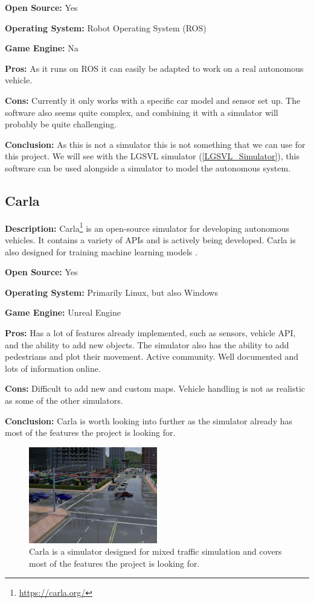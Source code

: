 \textbf{Open Source:} Yes

\textbf{Operating System:} Robot Operating System (ROS)

\textbf{Game Engine:} Na

\textbf{Pros:} As it runs on ROS it can easily be adapted to work on a real autonomous vehicle.

\textbf{Cons:} Currently it only works with a specific car model and sensor set up. The software also seems quite complex, and combining it with a simulator will probably be quite challenging.

\textbf{Conclusion:} As this is not a simulator this is not something that we can use for this project. We will see with the LGSVL simulator (\ref{LGSVL_Simulator}), this software can be used alongside a simulator to model the autonomous system. 


\subsection{Carla} \label{Carla}
\textbf{Description:} Carla\footnote{\url{https://carla.org/}} is an open-source simulator for developing autonomous vehicles. It contains a variety of APIs and is actively being developed. Carla is also designed for training machine learning models \cite{CarlaPaper}. 

\textbf{Open Source:} Yes

\textbf{Operating System:} Primarily Linux, but also Windows

\textbf{Game Engine:} Unreal Engine

\textbf{Pros:} Has a lot of features already implemented, such as sensors, vehicle API, and the ability to add new objects. The simulator also has the ability to add pedestrians and plot their movement. Active community. Well documented and lots of information online. 

\textbf{Cons:} Difficult to add new and custom maps. Vehicle handling is not as realistic as some of the other simulators.

\textbf{Conclusion:} Carla is worth looking into further as the simulator already has most of the features the project is looking for.


\begin{figure}[H]
    \centering
    \includegraphics[width=0.5\textwidth]{03_Background/Appendix/Simulators/Carla.JPG}
    \caption{Carla is a simulator designed for mixed traffic simulation and covers most of the features the project is looking for.}
\end{figure}


